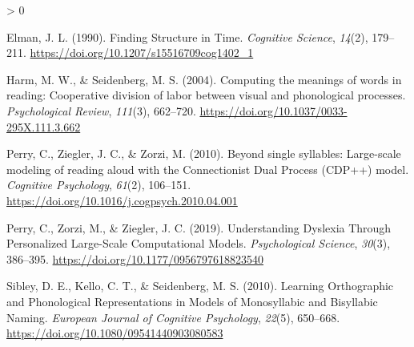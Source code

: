 \documentclass[
  american,
  man,floatsintext]{apa6}
\newlength{\cslhangindent}
\newenvironment{CSLReferences}[2] %
 {%
  \setlength{\parindent}{0pt}
  \ifodd #1 \everypar{\setlength{\hangindent}{\cslhangindent}}\ignorespaces\fi
  \ifnum #2 > 0
  \setlength{\parskip}{#2\baselineskip}
  \fi
 }%
 {}
\begin{document}
\hypertarget{refs}{}
\begin{CSLReferences}{1}{0}
\leavevmode\hypertarget{ref-Elman1990}{}%
Elman, J. L. (1990). {Finding Structure in Time}. \emph{Cognitive Science}, \emph{14}(2), 179--211. \url{https://doi.org/10.1207/s15516709cog1402_1}

\leavevmode\hypertarget{ref-Harm2004}{}%
Harm, M. W., \& Seidenberg, M. S. (2004). {Computing the meanings of words in reading: Cooperative division of labor between visual and phonological processes}. \emph{Psychological Review}, \emph{111}(3), 662--720. \url{https://doi.org/10.1037/0033-295X.111.3.662}

\leavevmode\hypertarget{ref-Perry2010}{}%
Perry, C., Ziegler, J. C., \& Zorzi, M. (2010). {Beyond single syllables: Large-scale modeling of reading aloud with the Connectionist Dual Process (CDP++) model}. \emph{Cognitive Psychology}, \emph{61}(2), 106--151. \url{https://doi.org/10.1016/j.cogpsych.2010.04.001}

\leavevmode\hypertarget{ref-Perry2019}{}%
Perry, C., Zorzi, M., \& Ziegler, J. C. (2019). {Understanding Dyslexia Through Personalized Large-Scale Computational Models}. \emph{Psychological Science}, \emph{30}(3), 386--395. \url{https://doi.org/10.1177/0956797618823540}

\leavevmode\hypertarget{ref-Sibley2010}{}%
Sibley, D. E., Kello, C. T., \& Seidenberg, M. S. (2010). {Learning Orthographic and Phonological Representations in Models of Monosyllabic and Bisyllabic Naming}. \emph{European Journal of Cognitive Psychology}, \emph{22}(5), 650--668. \url{https://doi.org/10.1080/09541440903080583}

\end{CSLReferences}


\clearpage
\renewcommand{\listtablename}{Table captions}
\end{document}
